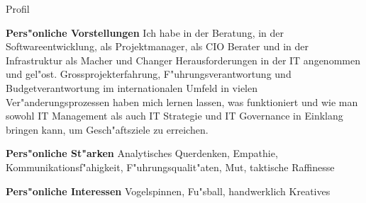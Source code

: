 \begin{rubric}{Profil}

\entry* \textbf{Pers"onliche Vorstellungen}\newline 
Ich habe in der Beratung, in der Softwareentwicklung, als Projektmanager, als CIO Berater und in der Infrastruktur als Macher und Changer Herausforderungen in der IT angenommen und gel"ost.  Grossprojekterfahrung, F"uhrungsverantwortung und Budgetverantwortung im internationalen Umfeld in vielen Ver"anderungsprozessen haben mich lernen lassen, was funktioniert und wie man sowohl IT Management als auch IT Strategie und IT Governance in Einklang bringen kann, um Gesch"aftsziele zu erreichen. 

\entry* \textbf{Pers"onliche St"arken}\newline 
Analytisches Querdenken, Empathie, Kommunikationsf"ahigkeit, F"uhrungsqualit"aten, Mut, taktische Raffinesse

\entry* \textbf{Pers"onliche Interessen}\newline  
Vogelspinnen, Fu"sball, handwerklich Kreatives

\end{rubric}
